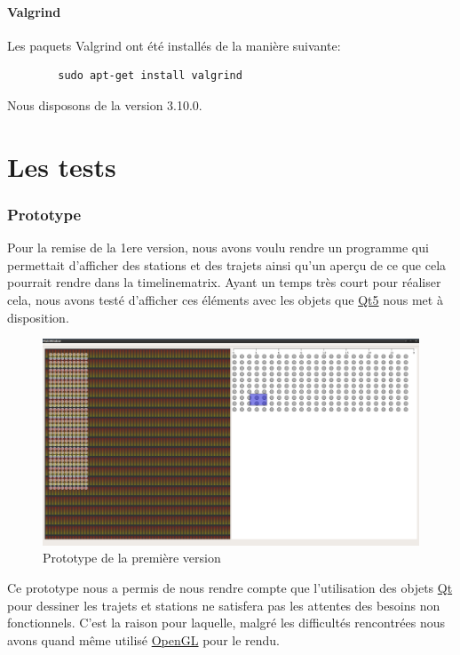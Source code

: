 \documentclass[12pt]{article}
\begin{document}
		\subsection{Valgrind}
		Les paquets Valgrind ont été installés de la manière suivante:
		\begin{verbatim}
		sudo apt-get install valgrind
		\end{verbatim}
		Nous disposons de la version 3.10.0.
		
\newpage
\part{Les tests}
	\section{Prototype}
	Pour la remise de la 1ere version, nous avons voulu rendre un programme qui permettait
	d'afficher des stations et des trajets ainsi qu'un aperçu de ce que cela pourrait rendre
	dans la timelinematrix. Ayant un temps très court pour réaliser cela, nous avons testé
	d'afficher ces éléments avec les objets que \href{https://www.qt.io/}{Qt5}
	nous met à disposition.\\
	

	\begin{figure}[!h]
	\begin{center}
	\includegraphics[scale=0.2]{prototype1_screen_shot.png}
	\caption{Prototype de la première version}
	\end{center}
	\end{figure}		
	
	Ce prototype nous a permis de nous rendre compte que l’utilisation des objets
	\href{https://www.qt.io/}{Qt} pour dessiner les trajets et stations
	ne satisfera pas les attentes des besoins non fonctionnels. C’est la raison pour
	laquelle, malgré les difficultés rencontrées nous avons quand même utilisé
	\href{https://www.khronos.org/registry/OpenGL-Refpages/gl4/}{OpenGL}
	pour le rendu.\\
	
\end{document}
